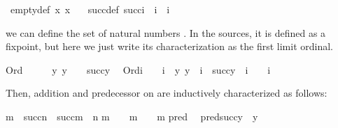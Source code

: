 \begin{isabelle}
\ empty{\uscore}{\kern0pt}def{\isacharprime}{\kern0pt}{\isacharcolon}{\kern0pt}\ {\isachardoublequoteopen}{\isasymforall}x{\isachardot}{\kern0pt}\ x\ {\isasymnotin}\ {}{\isachardoublequoteclose}%
\isanewline
{}
\ succ{\uscore}{\kern0pt}def{\isacharprime}{\kern0pt}{\isacharcolon}{\kern0pt}\ {\isachardoublequoteopen}succ{\isacharparenleft}{\kern0pt}i{\isacharparenright}{\kern0pt}\ {\isacharequal}{\kern0pt}\ i\ {\isasymunion}\ {\isacharbraceleft}{\kern0pt}i{\isacharbraceright}{\kern0pt}{\isachardoublequoteclose}%
\end{isabelle}
%
we can define the set of natural numbers \isa{{\isasymomega}}. In the
sources, it is  defined as a fixpoint, but here we just write
its characterization as the first limit ordinal.%
\begin{isabelle}%
Ord{\isacharparenleft}{\kern0pt}{\isasymomega}{\isacharparenright}{\kern0pt}\ {\isasymand}\ {}\ {\isacharless}{\kern0pt}\ {\isasymomega}\ {\isasymand}\ {\isacharparenleft}{\kern0pt}{\isasymforall}y{\isachardot}{\kern0pt}\ y\ {\isacharless}{\kern0pt}\ {\isasymomega}\ {\isasymlongrightarrow}\ succ{\isacharparenleft}{\kern0pt}y{\isacharparenright}{\kern0pt}\ {\isacharless}{\kern0pt}\ {\isasymomega}{\isacharparenright}{\kern0pt}\isasep\isanewline%
Ord{\isacharparenleft}{\kern0pt}i{\isacharparenright}{\kern0pt}\ {\isasymand}\ {}\ {\isacharless}{\kern0pt}\ i\ {\isasymand}\ {\isacharparenleft}{\kern0pt}{\isasymforall}y{\isachardot}{\kern0pt}\ y\ {\isacharless}{\kern0pt}\ i\ {\isasymlongrightarrow}\ succ{\isacharparenleft}{\kern0pt}y{\isacharparenright}{\kern0pt}\ {\isacharless}{\kern0pt}\ i{\isacharparenright}{\kern0pt}\ {\isasymLongrightarrow}\ {\isasymomega}\ {\isasymle}\ i%
\end{isabelle}%
Then, addition and predecessor on \isa{{\isasymomega}} are inductively
characterized as follows:%
\begin{isabelle}%
m\ {\isacharplus}{\kern0pt}\isactrlsub {\isasymomega}\ succ{\isacharparenleft}{\kern0pt}n{\isacharparenright}{\kern0pt}\ {\isacharequal}{\kern0pt}\ succ{\isacharparenleft}{\kern0pt}m\ {\isacharplus}{\kern0pt}\isactrlsub {\isasymomega}\ n{\isacharparenright}{\kern0pt}\isasep\isanewline%
m\ {\isasymin}\ {\isasymomega}\ {\isasymLongrightarrow}\ m\ {\isacharplus}{\kern0pt}\isactrlsub {\isasymomega}\ {}\ {\isacharequal}{\kern0pt}\ m\isasep\isanewline%
pred{\isacharparenleft}{\kern0pt}{}{\isacharparenright}{\kern0pt}\ {\isacharequal}{\kern0pt}\ {}\isasep\isanewline%
pred{\isacharparenleft}{\kern0pt}succ{\isacharparenleft}{\kern0pt}y{\isacharparenright}{\kern0pt}{\isacharparenright}{\kern0pt}\ {\isacharequal}{\kern0pt}\ y%
\end{isabelle}%
